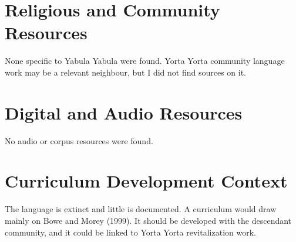 \documentclass[12pt]{article}
\begin{document}
\section{Religious and Community Resources}
None specific to Yabula Yabula were found. Yorta Yorta community language work may be a relevant neighbour, but I did not find sources on it.

\section{Digital and Audio Resources}
No audio or corpus resources were found.

\section{Curriculum Development Context}
The language is extinct and little is documented. A curriculum would draw mainly on Bowe and Morey (1999). It should be developed with the descendant community, and it could be linked to Yorta Yorta revitalization work.
\end{document}
